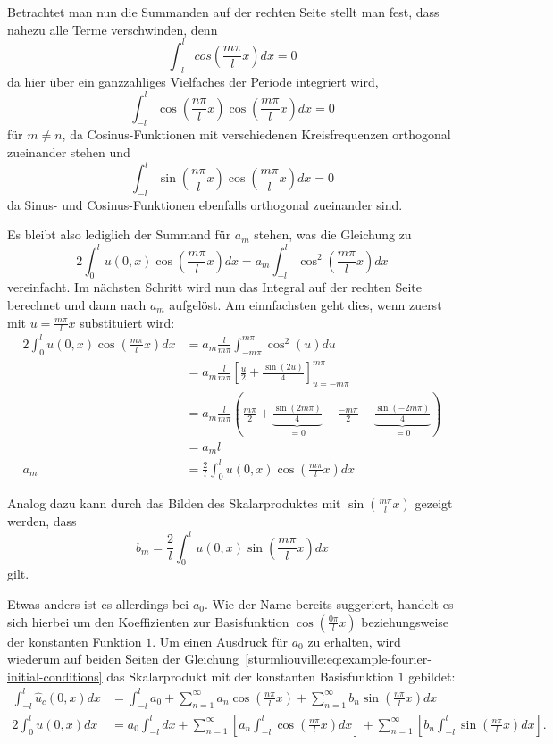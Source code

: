 Betrachtet man nun die Summanden auf der rechten Seite stellt man fest, dass
nahezu alle Terme verschwinden, denn
\[
    \int_{-l}^{l}cos\left(\frac{m \pi}{l}x\right) dx
    =
    0
\]
da hier über ein ganzzahliges Vielfaches der Periode integriert wird,
\[
    \int_{-l}^{l}\cos\left(\frac{n\pi}{l}x\right)
    \cos\left(\frac{m \pi}{l}x\right)dx
    =
    0
\]
für $m\neq n$, da Cosinus-Funktionen mit verschiedenen Kreisfrequenzen
orthogonal zueinander stehen und
\[
    \int_{-l}^{l}\sin\left(\frac{n\pi}{l}x\right)
        \cos\left(\frac{m \pi}{l}x\right)dx
    =
    0
\]
da Sinus- und Cosinus-Funktionen ebenfalls orthogonal zueinander sind.

Es bleibt also lediglich der Summand für $a_m$ stehen, was die Gleichung zu
\[
    2\int_{0}^{l}u(0, x)\cos\left(\frac{m \pi}{l}x\right)dx
    =
    a_m\int_{-l}^{l}\cos^2\left(\frac{m\pi}{l}x\right)dx
\]
vereinfacht. Im nächsten Schritt wird nun das Integral auf der rechten Seite
berechnet und dann nach $a_m$ aufgelöst. Am einnfachsten geht dies, wenn zuerst
mit $u = \frac{m \pi}{l}x$ substituiert wird:
\[
    \begin{aligned}
    2\int_{0}^{l}u(0, x)\cos\left(\frac{m \pi}{l}x\right)dx
    &=
    a_m\frac{l}{m\pi}\int_{-m\pi}^{m\pi}\cos^2\left(u\right)du
    \\
    &=
    a_m\frac{l}{m\pi}\left[\frac{u}{2} + 
    \frac{\sin\left(2u\right)}{4}\right]_{u=-m\pi}^{m\pi}
    \\
    &=
    a_m\frac{l}{m\pi}\left(\frac{m\pi}{2} + 
    \underbrace{\frac{\sin\left(2m\pi\right)}{4}}_{\displaystyle = 0} - 
    \frac{-m\pi}{2} -
    \underbrace{\frac{\sin\left(-2m\pi\right)}{4}}_{\displaystyle = 0}\right)
    \\
    &=
    a_m l
    \\
    a_m
    &=
    \frac{2}{l} \int_{0}^{l}u(0, x)\cos\left(\frac{m \pi}{l}x\right)dx
    \end{aligned}
\]

Analog dazu kann durch das Bilden des Skalarproduktes mit 
$ \sin\left(\frac{m \pi}{l}x\right) $ gezeigt werden, dass
\[
    b_m
    =
    \frac{2}{l} \int_{0}^{l}u(0, x)\sin\left(\frac{m \pi}{l}x\right)dx
\]
gilt.

Etwas anders ist es allerdings bei $a_0$.
Wie der Name bereits suggeriert, handelt es sich hierbei um den Koeffizienten
zur Basisfunktion $\cos\left(\frac{0 \pi}{l}x\right)$ beziehungsweise der
konstanten Funktion $1$.
Um einen Ausdruck für $a_0$ zu erhalten, wird wiederum auf beiden Seiten
der Gleichung~\eqref{sturmliouville:eq:example-fourier-initial-conditions} das
Skalarprodukt mit der konstanten Basisfunktion $1$ gebildet:
\[
\begin{aligned}
    \int_{-l}^{l}\hat{u}_c(0, x)dx
    &=
    \int_{-l}^{l} a_0
    +
    \sum_{n = 1}^{\infty} a_n\cos\left(\frac{n\pi}{l}x\right)
    +
    \sum_{n = 1}^{\infty} b_n\sin\left(\frac{n\pi}{l}x\right)dx
    \\
    2\int_{0}^{l}u(0, x)dx
    &=
    a_0 \int_{-l}^{l}dx
    +
    \sum_{n = 1}^{\infty}\left[a_n\int_{-l}^{l}\cos\left(\frac{n\pi}{l}x\right)
        dx\right] +
    \sum_{n = 1}^{\infty}\left[b_n\int_{-l}^{l}\sin\left(\frac{n\pi}{l}x\right)
        dx\right].
\end{aligned}
\]

